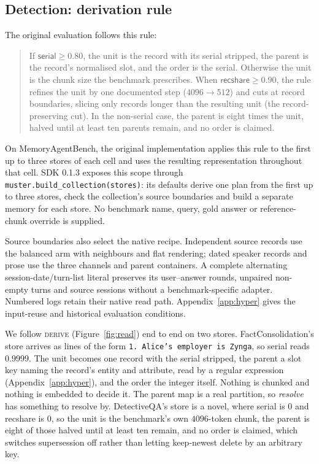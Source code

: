 \documentclass{article}
\newcommand{\serial}{\textsf{serial}}
\newcommand{\cov}{\textsf{recshare}}
\begin{document}
\subsection{Detection: derivation rule}\label{sec:rule}

The original evaluation follows this rule:
\begin{quote}
If $\serial \ge 0.80$, the unit is the record with its serial stripped, the parent is the record's
normalised slot, and the order is the serial. Otherwise the unit is the chunk size the benchmark
prescribes. When $\cov \ge 0.90$, the rule refines the unit by one documented step ($4096\to512$)
and cuts at record boundaries, slicing only records longer than the resulting unit (the record-preserving cut).
In the non-serial case, the parent is eight times the unit, halved until at least ten parents remain, and
no order is claimed.
\end{quote}

On MemoryAgentBench, the original implementation applies this rule to the first up to three stores of each cell and uses the resulting representation throughout that cell. SDK 0.1.3 exposes this scope through \texttt{muster.build\_collection(stores)}: its defaults derive one plan from the first up to three stores, check the collection's source boundaries and build a separate memory for each store. No benchmark name, query, gold answer or reference-chunk override is supplied.

Source boundaries also select the native recipe. Independent source records use the balanced arm with neighbours and flat rendering; dated speaker records and prose use the three channels and parent containers. A complete alternating session-date/turn-list literal preserves its user--answer rounds, unpaired non-empty turns and source sessions without a benchmark-specific adapter. Numbered logs retain their native read path. Appendix~\ref{app:hyper} gives the input-reuse and historical evaluation conditions.

We follow \textsc{derive} (Figure~\ref{fig:read}) end to end on two stores. FactConsolidation's store arrives as
lines of the form \texttt{1. Alice's employer is Zynga}, so \serial{} reads $0.9999$. The unit becomes one
record with the serial stripped, the parent a slot key naming the record's entity and attribute, read by a
regular expression (Appendix~\ref{app:hyper}), and the order the integer itself. Nothing is chunked and nothing is embedded to decide it. The parent map is a real
partition, so \emph{resolve} has something to resolve by. DetectiveQA's store is a novel, where \serial{}
is $0$ and \cov{} is $0$, so the unit is the benchmark's own $4096$-token chunk, the parent is eight of those
halved until at least ten remain, and no order is claimed, which switches supersession off rather than
letting keep-newest delete by an arbitrary key.
\end{document}
